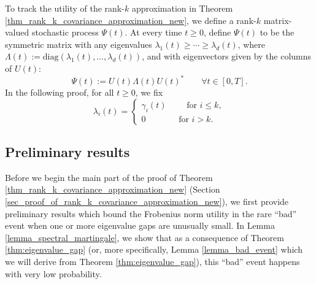\documentclass[11pt,letterpaper]{article}
\begin{document}
To track the utility of the rank-$k$ approximation in Theorem \ref{thm_rank_k_covariance_approximation_new}, we define a rank-$k$ matrix-valued stochastic process $\Psi(t)$.
%
%
 At every time $t \geq 0$, define $\Psi(t)$ to be the symmetric matrix with any eigenvalues $\lambda_1(t) \geq \cdots \geq \lambda_d(t)$, where $\Lambda(t) :=\mathrm{diag}(\lambda_1(t), \ldots, \lambda_d(t))$,   and with eigenvectors given by the columns of $U(t)$: 
%
 \begin{equation}\label{eq_n96}
       \Psi(t):= U(t) \Lambda(t) U(t)^\ast \qquad\forall t \in [0,T].
    \end{equation} 
% 
In the following proof, for all $t \geq 0$, we fix  
\begin{equation}\label{eq_n45}
    \lambda_i(t) = \begin{cases}
        \gamma_i(t) \qquad \textrm{ for } i\leq k,\\
        0 \qquad \quad \, \, \, \textrm{ for } i>k.%
    \end{cases}
\end{equation}






\subsection{Preliminary results}\label{sec_preliminary_results}

Before we begin the main part of the proof of Theorem \ref{thm_rank_k_covariance_approximation_new} (Section \ref{sec_proof_of_rank_k_covariance_approximation_new}), we first provide preliminary results which bound the Frobenius norm utility in the rare ``bad'' event when one or more eigenvalue gaps are unusually small.
%
In Lemma \ref{lemma_spectral_martingale}, we show that as a consequence of Theorem \ref{thm:eigenvalue_gap} (or, more specifically, Lemma  \ref{lemma_bad_event} which we will derive from  Theorem \ref{thm:eigenvalue_gap}), this ``bad'' event happens with very low probability.
\end{document}
